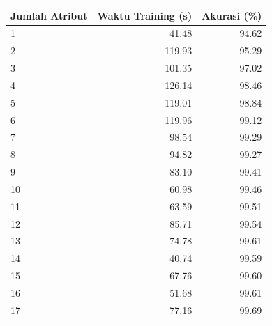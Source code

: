 \FloatBarrier
\begin{table}[]
\begin{tabular}{|l|r|r|}
\hline
Jumlah Atribut & \multicolumn{1}{l|}{Waktu Training (s)} & \multicolumn{1}{l|}{Akurasi (\%)} \\ \hline
1              & 41.48                                   & 94.62                             \\ \hline
2              & 119.93                                  & 95.29                             \\ \hline
3              & 101.35                                  & 97.02                             \\ \hline
4              & 126.14                                  & 98.46                             \\ \hline
5              & 119.01                                  & 98.84                             \\ \hline
6              & 119.96                                  & 99.12                             \\ \hline
7              & 98.54                                   & 99.29                             \\ \hline
8              & 94.82                                   & 99.27                             \\ \hline
9              & 83.10                                   & 99.41                             \\ \hline
10             & 60.98                                   & 99.46                             \\ \hline
11             & 63.59                                   & 99.51                             \\ \hline
12             & 85.71                                   & 99.54                             \\ \hline
13             & 74.78                                   & 99.61                             \\ \hline
14             & 40.74                                   & 99.59                             \\ \hline
15             & 67.76                                   & 99.60                             \\ \hline
16             & 51.68                                   & 99.61                             \\ \hline
17             & 77.16                                   & 99.69                             \\ \hline

\end{tabular}
\end{table}
